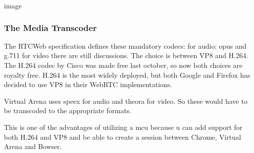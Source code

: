 image

\subsubsection{The Media Transcoder}
The RTCWeb specification defines these mandatory codecs:
for audio: opus and g.711
for video there are still discussions. The choice is between VP8 and H.264. The H.264 codec by Cisco was made free last october, so now both choices are royalty free. H.264 is the most widely deployed, but both Google and Firefox has decided to use VP8 in their WebRTC implementations.

Virtual Arena uses speex for audio and theora for video. So these would have to be transcoded to the appropriate formats.

This is one of the advantages of utilizing a \gls{mcu} because u can add support for both H.264 and VP8 and be able to create a session between Chrome, Virtual Arena and Bowser.